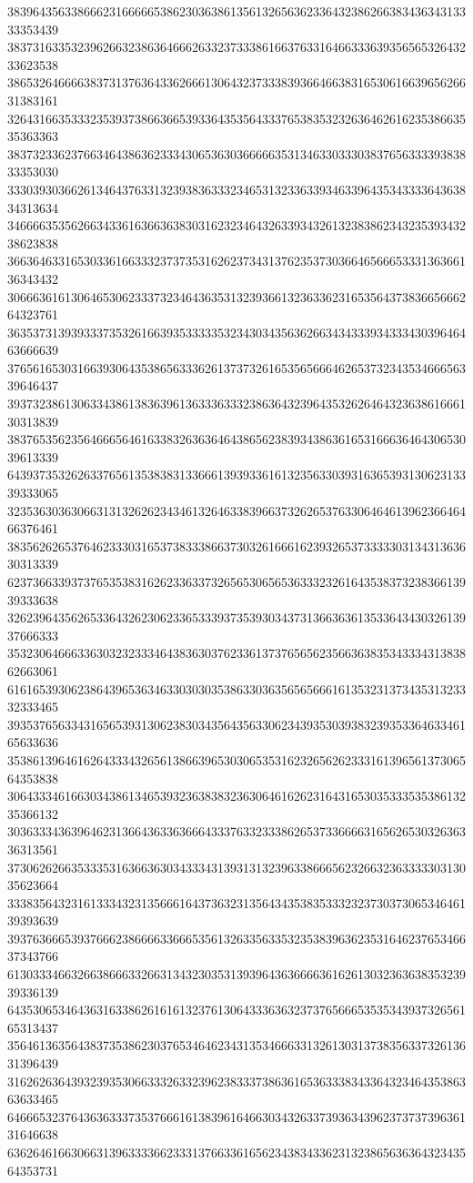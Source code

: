38396435633866623166666538623036386135613265636233643238626638343634313333353439
38373163353239626632386364666263323733386166376331646633363935656532643233623538
38653264666638373137636433626661306432373338393664663831653061663965626631383161
32643166353332353937386636653933643535643337653835323263646261623538663535363363
38373233623766346438636233343065363036666635313463303330383765633339383833353030
33303930366261346437633132393836333234653132336339346339643534333364363834313634
34666635356266343361636636383031623234643263393432613238386234323539343238623838
36636463316530336166333237373531626237343137623537303664656665333136366136343432
30666361613064653062333732346436353132393661323633623165356437383665666264323761
36353731393933373532616639353333353234303435636266343433393433343039646463666639
37656165303166393064353865633362613737326165356566646265373234353466656339646437
39373238613063343861383639613633363332386364323964353262646432363861666130313839
38376535623564666564616338326363646438656238393438636165316663646430653039613339
64393735326263376561353838313366613939336161323563303931636539313062313339333065
32353630363066313132626234346132646338396637326265376330646461396236646466376461
38356262653764623330316537383338663730326166616239326537333330313431363630313339
62373663393737653538316262336337326565306565363332326164353837323836613939333638
32623964356265336432623062336533393735393034373136636361353364343032613937666333
35323064666336303232333464383630376233613737656562356636383534333431383862663061
61616539306238643965363463303030353863303635656566616135323137343531323332333465
39353765633431656539313062383034356435633062343935303938323935336463346165633636
35386139646162643334326561386639653030653531623265626233316139656137306564353838
30643334616630343861346539323638383236306461626231643165303533353538613235366132
30363334363964623136643633636664333763323338626537336666316562653032636336313561
37306262663533353163663630343334313931313239633866656232663236333330313035623664
33383564323161333432313566616437363231356434353835333232373037306534646139393639
39376366653937666238666633666535613263356335323538396362353164623765346637343766
61303334663266386663326631343230353139396436366663616261303236363835323939336139
64353065346436316338626161613237613064333636323737656665353534393732656165313437
35646136356438373538623037653464623431353466633132613031373835633732613631396439
31626263643932393530663332633239623833373863616536333834336432346435386363633465
64666532376436363337353766616138396164663034326337393634396237373739636131646638
63626461663066313963333662333137663361656234383433623132386563636432343564353731
